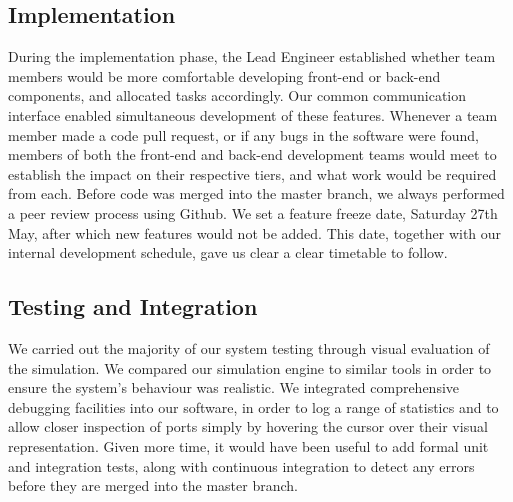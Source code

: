 \subsection{Implementation}

During the implementation phase, the Lead Engineer established whether team members would be more comfortable developing front-end or back-end components, and allocated tasks accordingly. Our common communication interface enabled simultaneous development of these features. Whenever a team member made a code pull request, or if any bugs in the software were found, members of both the front-end and back-end development teams would meet to establish the impact on their respective tiers, and what work would be required from each. Before code was merged into the master branch, we always performed a peer review process using Github. We set a feature freeze date, Saturday 27th May, after which new features would not be added. This date, together with our internal development schedule, gave us clear a clear timetable to follow.

\subsection{Testing and Integration}

We carried out the majority of our system testing through visual evaluation of the simulation. We compared our simulation engine to similar tools in order to ensure the system's behaviour was realistic. We integrated comprehensive debugging facilities into our software, in order to log a range of statistics and to allow closer inspection of ports simply by hovering the cursor over their visual representation. Given more time, it would have been useful to add formal unit and integration tests, along with continuous integration to detect any errors before they are merged into the master branch.




